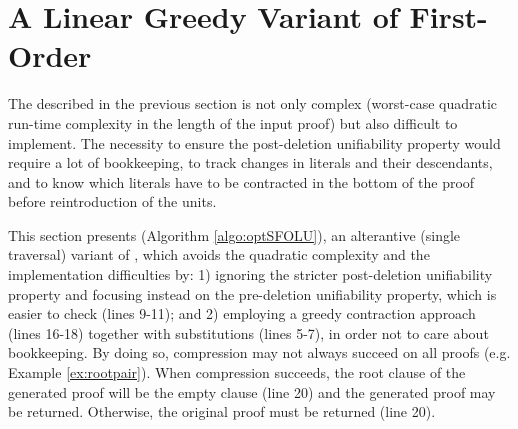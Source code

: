 
\section{A Linear Greedy Variant of First-Order \LowerUnits}
\label{sec:SimpleFOLU}

The {\FOLowerUnits} described in the previous section is not only complex (worst-case quadratic run-time complexity in the length of the input proof) but also difficult to implement. The necessity to ensure the post-deletion unifiability property would require a lot of bookkeeping, to track changes in literals and their descendants, and to know which literals have to be contracted in the bottom of the proof before reintroduction of the units. 

This section presents {\SFOLowerUnits} (Algorithm \ref{algo:optSFOLU}), an alterantive (single traversal) variant of {\FOLowerUnits}, which avoids the quadratic complexity and the implementation difficulties by: 1) ignoring the stricter post-deletion unifiability property and focusing instead on the pre-deletion unifiability property, which is easier to check (lines 9-11); and 2) employing a greedy contraction approach (lines 16-18) together with substitutions (lines 5-7), in order not to care about bookkeeping. By doing so, compression may not always succeed on all proofs (e.g. Example \ref{ex:rootpair}). When compression succeeds, the root clause of the generated proof will be the empty clause (line 20) and the generated proof may be returned. Otherwise, the original proof must be returned (line 20).


